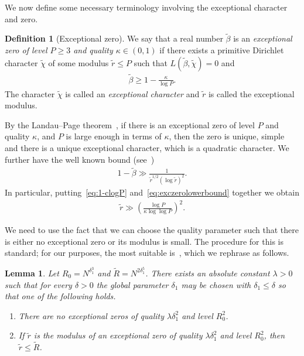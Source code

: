 \documentclass[12pt]{amsart}
\newtheorem{lemma}[theorem]{Lemma}
\theoremstyle{definition}
\newtheorem{definition}[theorem]{Definition}
\theoremstyle{remark}
\numberwithin{equation}{section}
\newcommand{\1}{\mathbf{1}}
\begin{document}
We now define some necessary terminology involving the exceptional character and zero.
	\begin{definition}[Exceptional zero]\label{def:exceptional} We say that a real number $\widetilde{\beta}$ is an \emph{exceptional zero of level $P\geq 3$ and quality $\kappa \in (0,1)$} if there exists a primitive Dirichlet character $\widetilde{\chi}$ of some modulus $\widetilde{r}\leq P$ such that $L(\widetilde{\beta},\widetilde{\chi})=0$ and
 \begin{align}\label{eq:1-clogP}
  \widetilde{\beta} \geq 1-\frac{\kappa}{\log P}.   
 \end{align}
 The character $\widetilde{\chi}$ is called an \emph{exceptional character} and $\widetilde{r}$ is called the exceptional modulus.
	\end{definition}

 By the Landau--Page theorem~\cite[Corollary 11.10]{MV-book}, if there is an exceptional zero of level $P$ and quality $\kappa$, and $P$ is large enough in terms of $\kappa$, then the zero is unique, simple and there is a unique exceptional character, which is a quadratic character. We further have the well known bound (see~\cite[equation (4.1)]{mv})
 \begin{align}\label{eq:exczerolowerbound}
     1-\widetilde{\beta}\gg \frac{1}{\widetilde{r}^{1/2} (\log \widetilde{r})^2}.
 \end{align}
In particular, putting~\eqref{eq:1-clogP} and~\eqref{eq:exczerolowerbound} together we obtain  
\begin{align}\label{eq:rlowerbound}
\widetilde{r}\gg \left(\frac{\log P}{\kappa \log \log P}\right)^2.
\end{align}


    We need to use the fact that we can choose the quality parameter such that there is either no exceptional zero or its modulus is small. The procedure for this is standard; for our purposes, the most suitable is~\cite[Proposition 7.3.]{green-sarkozy}, which we rephrase as follows. 

	\begin{lemma}\label{lem_excmodulussize} Let $R_0=N^{\delta_1^3}$ and $\widetilde{R}=N^{2\delta_1^5}$.
    There exists an absolute constant $\lambda >0$ such that for every $\delta>0$ the global parameter $\delta_1$ may be chosen with $\delta_1\leq\delta$ so that one of the following holds.
   \begin{enumerate}
       \item There are no exceptional zeros of quality $\lambda  \delta_1^2$ and level $R_0^2$.
       \item If $\widetilde{r}$ is the modulus of an exceptional zero of quality $\lambda  \delta_1^2$ and level $R_0^2$, then $\widetilde{r}\leq \widetilde{R}$.  
   \end{enumerate}    

	\end{lemma}
\end{document}
